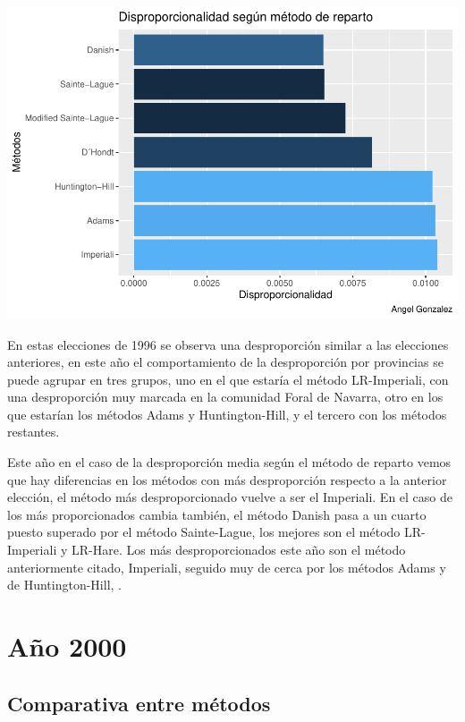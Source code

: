 \documentclass[12pt,a4paper,]{book}
\numberwithin{dummy}{section}
\theoremstyle{ocrenumbox}
\theoremstyle{blacknumex}
\theoremstyle{blacknumbox}
\theoremstyle{ocrenum}
\theoremstyle{ocrenum}
\begin{document}
\begin{center}\includegraphics[width=1\linewidth]{figurasR/unnamed-chunk-24-2} \end{center}

En estas elecciones de 1996 se observa una desproporción similar a las
elecciones anteriores, en este año el comportamiento de la desproporción
por provincias se puede agrupar en tres grupos, uno en el que estaría el
método LR-Imperiali, con una desproporción muy marcada en la comunidad
Foral de Navarra, otro en los que estarían los métodos Adams y
Huntington-Hill, y el tercero con los métodos restantes.

Este año en el caso de la desproporción media según el método de reparto
vemos que hay diferencias en los métodos con más desproporción respecto
a la anterior elección, el método más desproporcionado vuelve a ser el
Imperiali. En el caso de los más proporcionados cambia también, el
método Danish pasa a un cuarto puesto superado por el método
Sainte-Lague, los mejores son el método LR-Imperiali y LR-Hare. Los más
desproporcionados este año son el método anteriormente citado,
Imperiali, seguido muy de cerca por los métodos Adams y de
Huntington-Hill, .

\hypertarget{auxf1o-2000}{%
\section{Año 2000}\label{auxf1o-2000}}

\hypertarget{comparativa-entre-muxe9todos-7}{%
\subsection{Comparativa entre
métodos}\label{comparativa-entre-muxe9todos-7}}
\end{document}
